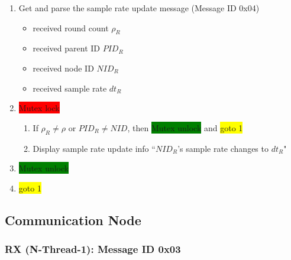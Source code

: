 \documentclass[letterpaper,10pt]{article}
\begin{document}
\begin{enumerate}
	\item Get and parse the sample rate update message (Message ID 0x04)
	\begin{itemize}
		\item received round count $\rho_R$
		\item received parent ID $PID_R$
		\item received node ID $NID_R$
		\item received sample rate $dt_R$
	\end{itemize}
	\item \colorbox{red}{Mutex lock}
	\begin{enumerate}
		\item If $\rho_R \neq \rho$ or $PID_R \neq NID$, then \colorbox{green}{Mutex unlock} and \colorbox{yellow}{goto 1}
		\item Display sample rate update info ``$NID_R$'s sample rate changes to $dt_R$"
	\end{enumerate}
	\item \colorbox{green}{Mutex unlock}
	\item \colorbox{yellow}{goto 1}
\end{enumerate}

\subsection{Communication Node}

\subsubsection{RX (N-Thread-1): Message ID 0x03}
\end{document}
